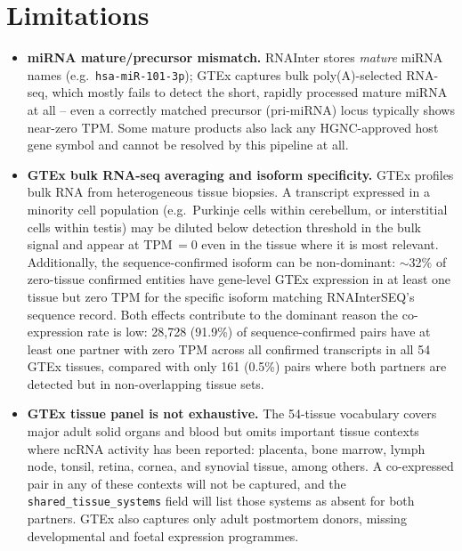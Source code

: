 \documentclass[11pt]{article}
\begin{document}
\section{Limitations}
\begin{sloppypar}
\begin{itemize}
  \item \textbf{miRNA mature/precursor mismatch.} RNAInter stores
        \emph{mature} miRNA names (e.g.\ \texttt{hsa-miR-101-3p}); GTEx
        captures bulk poly(A)-selected RNA-seq, which mostly fails to detect
        the short, rapidly processed mature miRNA at all -- even a correctly
        matched precursor (pri-miRNA) locus typically shows near-zero TPM.
        Some mature products also lack any HGNC-approved host gene symbol
        and cannot be resolved by this pipeline at all.
  \item \textbf{GTEx bulk RNA-seq averaging and isoform specificity.} GTEx
        profiles bulk RNA from heterogeneous tissue biopsies. A transcript
        expressed in a minority cell population (e.g.\ Purkinje cells within
        cerebellum, or interstitial cells within testis) may be diluted below
        detection threshold in the bulk signal and appear at TPM\,$= 0$ even
        in the tissue where it is most relevant. Additionally, the
        sequence-confirmed isoform can be non-dominant: $\sim$32\% of
        zero-tissue confirmed entities have gene-level GTEx expression in at
        least one tissue but zero TPM for the specific isoform matching
        RNAInterSEQ's sequence record. Both effects contribute to the
        dominant reason the co-expression rate is low: 28,728
        (91.9\%) of sequence-confirmed pairs have at least one
        partner with zero TPM across all confirmed transcripts in all 54 GTEx
        tissues, compared with only 161 (0.5\%) pairs where
        both partners are detected but in non-overlapping tissue sets.
  \item \textbf{GTEx tissue panel is not exhaustive.} The 54-tissue
        vocabulary covers major adult solid organs and blood but omits
        important tissue contexts where ncRNA activity has been reported:
        placenta, bone marrow, lymph node, tonsil, retina, cornea, and
        synovial tissue, among others. A co-expressed pair in any of these
        contexts will not be captured, and the \texttt{shared\_tissue\_systems}
        field will list those systems as absent for both partners.
        GTEx also captures only adult postmortem donors, missing
        developmental and foetal expression programmes.

\end{itemize}
\end{sloppypar}
\end{document}
